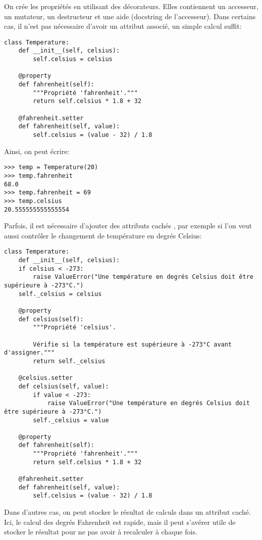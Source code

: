 On crée les propriétés en utilisant des décorateurs. Elles contiennent un accesseur, un mutateur, un destructeur et une aide (docstring de l'accesseur). Dans certains cas, il n'est pas nécessaire d'avoir un attribut associé, un simple calcul suffit:

\begin{verbatim}
class Temperature:
    def __init__(self, celsius):
        self.celsius = celsius
    
    @property
    def fahrenheit(self):
        """Propriété 'fahrenheit'."""
        return self.celsius * 1.8 + 32
    
    @fahrenheit.setter
    def fahrenheit(self, value):
        self.celsius = (value - 32) / 1.8
\end{verbatim}

Ainsi, on peut écrire:
\begin{verbatim}
>>> temp = Temperature(20)
>>> temp.fahrenheit
68.0
>>> temp.fahrenheit = 69
>>> temp.celsius
20.555555555555554
\end{verbatim}

Parfois, il est nécessaire d'ajouter des attributs \og cachés \fg{}, par exemple si l'on veut aussi contrôler le changement de 
température en degrés Celsius:

\begin{verbatim}
class Temperature:
    def __init__(self, celsius):
    if celsius < -273:
        raise ValueError("Une température en degrés Celsius doit être supérieure à -273°C.")
    self._celsius = celsius
    
    @property
    def celsius(self):
        """Propriété 'celsius'.
        
        Vérifie si la température est supérieure à -273°C avant d'assigner."""
        return self._celsius

    @celsius.setter
    def celsius(self, value):
        if value < -273:
            raise ValueError("Une température en degrés Celsius doit être supérieure à -273°C.")
        self._celsius = value
            
    @property
    def fahrenheit(self):
        """Propriété 'fahrenheit'."""
        return self.celsius * 1.8 + 32

    @fahrenheit.setter
    def fahrenheit(self, value):
        self.celsius = (value - 32) / 1.8
\end{verbatim}

Dans d'autres cas, on peut stocker le résultat de calculs dans un attribut caché. Ici, le calcul des degrés Fahrenheit est
rapide, mais il peut s'avérer utile de stocker le résultat pour ne pas avoir à recalculer à chaque fois.\bigskip


